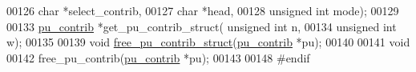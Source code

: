 \begin{DoxyCode}
00126             \textcolor{keywordtype}{char} *select\_contrib,
00127             \textcolor{keywordtype}{char} *head,
00128             \textcolor{keywordtype}{unsigned} \textcolor{keywordtype}{int} mode);
00129 
00133 \hyperlink{group__data__structures_structpu__contrib}{pu\_contrib}  *get\_pu\_contrib\_struct( \textcolor{keywordtype}{unsigned} \textcolor{keywordtype}{int} n,
00134                                     \textcolor{keywordtype}{unsigned} \textcolor{keywordtype}{int} w);
00135 
00139 \textcolor{keywordtype}{void}        \hyperlink{group__up__cofold_gac20bd61824981d45ce0dc9934aa56df8}{free\_pu\_contrib\_struct}(\hyperlink{group__data__structures_structpu__contrib}{pu\_contrib} *pu);
00140 
00141 \textcolor{keywordtype}{void}
00142 free\_pu\_contrib(\hyperlink{group__data__structures_structpu__contrib}{pu\_contrib} *pu);
00143 
00148 \textcolor{preprocessor}{#endif}
\end{DoxyCode}

